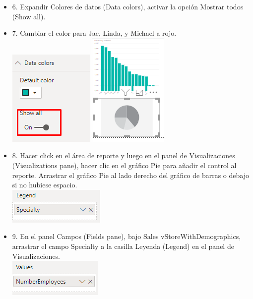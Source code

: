 \begin{itemize}
\item 6. Expandir Colores de datos (Data colors), activar la opción Mostrar todos (Show all). \\
\item 7. Cambiar el color para Jae, Linda, y Michael a rojo. \\
\includegraphics[scale=0.5]{./Imagenes/image019}
\includegraphics[scale=0.8]{./Imagenes/image020}
\item 8. Hacer click en el área de reporte y luego en el panel de Visualizaciones (Visualizations pane), hacer clic en el gráfico Pie para añadir el control al reporte. Arrastrar el gráfico Pie al lado derecho del gráfico de barras o debajo si no hubiese espacio.  \\
\includegraphics[scale=0.5]{./Imagenes/image021}
\item 9. En el panel Campos (Fields pane), bajo Sales vStoreWithDemographics, arrastrar el campo Specialty a la casilla Leyenda (Legend) en el panel de Visualizaciones. \\
\includegraphics[scale=0.5]{./Imagenes/image022}


\end{itemize}

